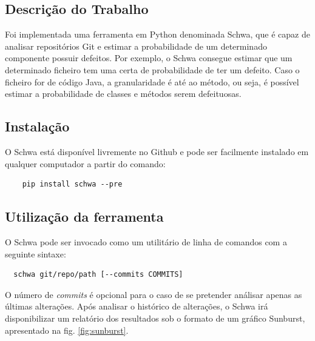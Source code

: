 \documentclass[9pt,a4paper]{extarticle}
\begin{document}
\begin{multicols}{2}
\section{Descrição do Trabalho}\label{sec:work}
Foi implementada uma ferramenta em Python denominada Schwa, que é capaz de
analisar repositórios Git e estimar a probabilidade de um determinado componente
possuir defeitos. Por exemplo, o Schwa consegue estimar que um determinado
ficheiro tem uma certa de probabilidade de ter um defeito. Caso o ficheiro for
de código Java, a granularidade é até ao método, ou seja, é possível estimar
a probabilidade de classes e métodos serem defeituosas.

\subsection{Instalação}
O Schwa está disponível livremente no Github e pode ser facilmente instalado em
qualquer computador a partir do comando:
\begin{verbatim}
    pip install schwa --pre
\end{verbatim}

\subsection{Utilização da ferramenta}
O Schwa pode ser invocado como um utilitário de linha de comandos com a seguinte
sintaxe:

\begin{verbatim}
  schwa git/repo/path [--commits COMMITS]
\end{verbatim}

O número de \emph{commits} é opcional para o caso de se pretender análisar
apenas as últimas alterações. Após analisar o histórico de alterações, o Schwa
irá disponibilizar um relatório dos resultados sob o formato de um gráfico
Sunburst, apresentado na fig. \ref{fig:sunburst}.


\end{multicols}
\end{document}
